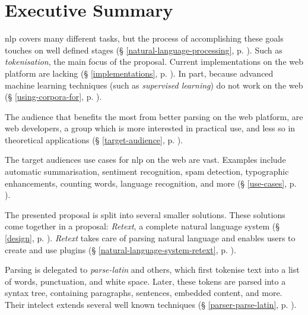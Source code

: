 
\begingroup
\let\clearpage\relax
\let\cleardoublepage\relax
\let\cleardoublepage\relax

\chapter*{Executive Summary}

\gls{nlp} covers many different tasks, but the process of accomplishing
  these goals touches on well defined stages
  (§ \ref{natural-language-processing},
  p. \pageref{natural-language-processing}).
Such as \emph{tokenisation}, the main focus of the proposal.
Current implementations on the web platform are lacking
  (§ \ref{implementations}, p. \pageref{implementations}).
In part, because advanced machine learning techniques (such as
  \emph{supervised learning}) do not work on the web
  (§ \ref{using-corpora-for}, p. \pageref{using-corpora-for}).

The audience that benefits the most from better parsing on the web platform,
  are web developers, a group which is more interested in practical use, and
  less so in theoretical applications
  (§ \ref{target-audience}, p. \pageref{target-audience}).

The target audiences use cases for \gls{nlp} on the web are vast. Examples
  include automatic summarisation, sentiment recognition, spam detection,
  typographic enhancements, counting words, language recognition, and more
  (§ \ref{use-cases}, p. \pageref{use-cases}).

The presented proposal is split into several smaller solutions.
These solutions come together in a proposal: \emph{Retext}, a complete
  natural language system (§ \ref{design}, p. \pageref{design}).
\emph{Retext} takes care of parsing natural language and enables users to
  create and use plugins (§ \ref{natural-language-system-retext},
  p. \pageref{natural-language-system-retext}).

Parsing is delegated to \emph{parse-latin} and others, which first tokenise
  text into a list of words, punctuation, and white space. Later, these
  tokens are parsed into a syntax tree, containing paragraphs, sentences,
  embedded content, and more. Their intelect extends several well known
  techniques (§ \ref{parser-parse-latin}, p. \pageref{parser-parse-latin}).

